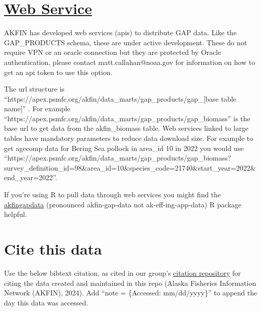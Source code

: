 \documentclass[
  letterpaper,
  oneside,
  open=any]{scrbook}
\begin{document}
\section*{\texorpdfstring{\href{https://afsc-gap-products.github.io/gap_products/content/akfin-api-r.html}{Web
Service}}{Web Service}}\label{web-service}


AKFIN has developed web services (apis) to distribute GAP data. Like the
GAP\_PRODUCTS schema, these are under active development. These do not
require VPN or an oracle connection but they are protected by Oracle
authentication, please contact matt.callahan@noaa.gov for information on
how to get an api token to use this option.

The url structure is
``https://apex.psmfc.org/akfin/data\_marts/gap\_products/gap\_{[}base
table name{]}'' . For example
``https://apex.psmfc.org/akfin/data\_marts/gap\_products/gap\_biomass''
is the base url to get data from the akfin\_biomass table. Web services
linked to large tables have mandatory parameters to reduce data download
size. For example to get agecomp data for Bering Sea pollock in area\_id
10 in 2022 you would use
``https://apex.psmfc.org/akfin/data\_marts/gap\_products/gap\_biomass?survey\_definition\_id=98\&area\_id=10\&species\_code=21740\&start\_year=2022\&end\_year=2022''.

If you're using R to pull data through web services you might find the
\href{https://github.com/MattCallahan-NOAA/akfingapdata/tree/main}{akfingapdata}
(pronounced akfin-gap-data not ak-eff-ing-app-data) R package helpful.

\section*{Cite this data}\label{cite-this-data-2}


Use the below bibtext citation, as cited in our group's
\href{https://github.com/afsc-gap-products/citations/blob/main/cite/bibliography.bib}{citation
repository} for citing the data created and maintained in this repo
(Alaska Fisheries Information Network (AKFIN), 2024). Add ``note =
\{Accessed: mm/dd/yyyy\}'' to append the day this data was accessed.
\end{document}
